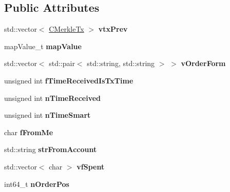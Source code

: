 \subsection*{Public Attributes}
\begin{DoxyCompactItemize}
\item 
\mbox{\label{class_c_wallet_tx_ae122d2e0ce296bd9dfc63eb3ede5ce98}} 
std\+::vector$<$ \mbox{\hyperlink{class_c_merkle_tx}{C\+Merkle\+Tx}} $>$ {\bfseries vtx\+Prev}
\item 
\mbox{\label{class_c_wallet_tx_a17229eca0c81245312115a9c333203d8}} 
map\+Value\+\_\+t {\bfseries map\+Value}
\item 
\mbox{\label{class_c_wallet_tx_a923dbbba343b8f4d1c3d89ae73bdcea0}} 
std\+::vector$<$ std\+::pair$<$ std\+::string, std\+::string $>$ $>$ {\bfseries v\+Order\+Form}
\item 
\mbox{\label{class_c_wallet_tx_ac058c61be3a1c680a3ad384ff04d27eb}} 
unsigned int {\bfseries f\+Time\+Received\+Is\+Tx\+Time}
\item 
\mbox{\label{class_c_wallet_tx_af4f4b58875061467026da7b259532b69}} 
unsigned int {\bfseries n\+Time\+Received}
\item 
\mbox{\label{class_c_wallet_tx_a3c9ba52ce7203b9f16235785a09c383c}} 
unsigned int {\bfseries n\+Time\+Smart}
\item 
\mbox{\label{class_c_wallet_tx_a1598bf4a18fd05ce5eaaa0c3eb58ff28}} 
char {\bfseries f\+From\+Me}
\item 
\mbox{\label{class_c_wallet_tx_a099b5ca562f8a8378124b345b9123f25}} 
std\+::string {\bfseries str\+From\+Account}
\item 
\mbox{\label{class_c_wallet_tx_a32c09e049302518c81f80c4f1f85583b}} 
std\+::vector$<$ char $>$ {\bfseries vf\+Spent}
\item 
\mbox{\label{class_c_wallet_tx_af51e160ff1d9d78986e9f239c7ac7a35}} 
int64\+\_\+t {\bfseries n\+Order\+Pos}
\item 

\end{DoxyCompactItemize}
